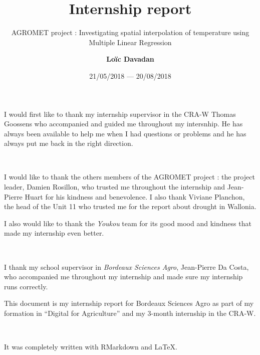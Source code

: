 \documentclass[12pt,twoside]{reedthesis}
\title{Internship report}
\author{\textbf{Loïc Davadan}}
\date{21/05/2018 --- 20/08/2018}
\subtitle{AGROMET project : Investigating spatial interpolation of temperature
using Multiple Linear Regression}
\theoremstyle{definition}
\theoremstyle{definition}
\theoremstyle{definition}
\theoremstyle{remark}
\begin{document}
  \maketitle

\frontmatter %
\pagestyle{empty} %
  \begin{acknowledgements}
    I would first like to thank my internship supervisor in the CRA-W Thomas
    Goossens who accompanied and guided me throughout my intersnhip. He has
    always been available to help me when I had questions or problems and he
    has always put me back in the right direction.
    
    ~
    
    I would like to thank the others members of the AGROMET project : the
    project leader, Damien Rosillon, who trusted me throughout the
    internship and Jean-Pierre Huart for his kindness and benevolence. I
    also thank Viviane Planchon, the head of the Unit 11 who trusted me for
    the report about drought in Wallonia.
    
    I also would like to thank the \emph{Youkou} team for its good mood and
    kindness that made my internship even better.
    
    ~
    
    I thank my school supervisor in \emph{Bordeaux Sciences Agro},
    Jean-Pierre Da Costa, who accompanied me throughout my internship and
    made sure my internship runs correctly.
  \end{acknowledgements}
  \begin{preface}
    This document is my internship report for Bordeaux Sciences Agro as part
    of my formation in ``Digital for Agriculture'' and my 3-month internship
    in the CRA-W.
    
    ~
    
    It was completely written with RMarkdown and \LaTeX.
  \end{preface}
\end{document}
